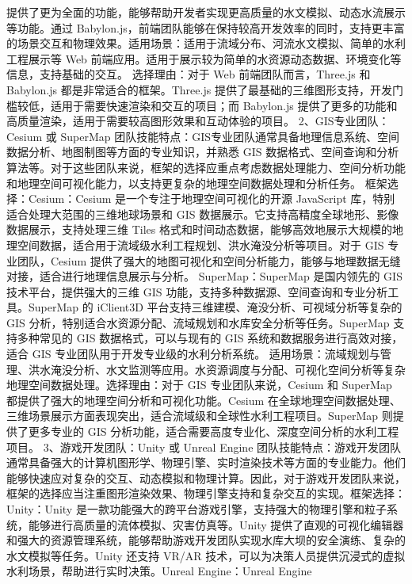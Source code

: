 {提供了更为全面的功能，能够帮助开发者实现更高质量的水文模拟、动态水流展示等功能。通过 Babylon.js，前端团队能够在保持较高开发效率的同时，支持更丰富的场景交互和物理效果。适用场景：适用于流域分布、河流水文模拟、简单的水利工程展示等
Web 前端应用。适用于展示较为简单的水资源动态数据、环境变化等信息，支持基础的交互。 选择理由：对于 Web 前端团队而言，Three.js 和 Babylon.js 都是非常适合的框架。Three.js
提供了最基础的三维图形支持，开发门槛较低，适用于需要快速渲染和交互的项目；而 Babylon.js 提供了更多的功能和高质量渲染，适用于需要较高图形效果和互动体验的项目。 2、GIS专业团队：Cesium 或 SuperMap
团队技能特点：GIS专业团队通常具备地理信息系统、空间数据分析、地图制图等方面的专业知识，并熟悉 GIS
数据格式、空间查询和分析算法等。对于这些团队来说，框架的选择应重点考虑数据处理能力、空间分析功能和地理空间可视化能力，以支持更复杂的地理空间数据处理和分析任务。 框架选择：Cesium：Cesium 是一个专注于地理空间可视化的开源
JavaScript 库，特别适合处理大范围的三维地球场景和 GIS 数据展示。它支持高精度全球地形、影像数据展示，支持处理三维 Tiles
格式和时间动态数据，能够高效地展示大规模的地理空间数据，适合用于流域级水利工程规划、洪水淹没分析等项目。对于 GIS 专业团队，Cesium 提供了强大的地图可视化和空间分析能力，能够与地理数据无缝对接，适合进行地理信息展示与分析。
SuperMap：SuperMap 是国内领先的 GIS 技术平台，提供强大的三维 GIS 功能，支持多种数据源、空间查询和专业分析工具。SuperMap 的 iClient3D 平台支持三维建模、淹没分析、可视域分析等复杂的 GIS
分析，特别适合水资源分配、流域规划和水库安全分析等任务。SuperMap 支持多种常见的 GIS 数据格式，可以与现有的 GIS 系统和数据服务进行高效对接，适合 GIS 专业团队用于开发专业级的水利分析系统。
适用场景：流域规划与管理、洪水淹没分析、水文监测等应用。水资源调度与分配、可视化空间分析等复杂地理空间数据处理。选择理由：对于 GIS 专业团队来说，Cesium 和 SuperMap 都提供了强大的地理空间分析和可视化功能。Cesium
在全球地理空间数据处理、三维场景展示方面表现突出，适合流域级和全球性水利工程项目。SuperMap 则提供了更多专业的 GIS 分析功能，适合需要高度专业化、深度空间分析的水利工程项目。 3、游戏开发团队：Unity 或 Unreal
Engine
团队技能特点：游戏开发团队通常具备强大的计算机图形学、物理引擎、实时渲染技术等方面的专业能力。他们能够快速应对复杂的交互、动态模拟和物理计算。因此，对于游戏开发团队来说，框架的选择应当注重图形渲染效果、物理引擎支持和复杂交互的实现。框架选择：Unity：Unity
是一款功能强大的跨平台游戏引擎，支持强大的物理引擎和粒子系统，能够进行高质量的流体模拟、灾害仿真等。Unity 提供了直观的可视化编辑器和强大的资源管理系统，能够帮助游戏开发团队实现水库大坝的安全演练、复杂的水文模拟等任务。Unity
还支持 VR/AR 技术，可以为决策人员提供沉浸式的虚拟水利场景，帮助进行实时决策。Unreal Engine：Unreal Engine
}
